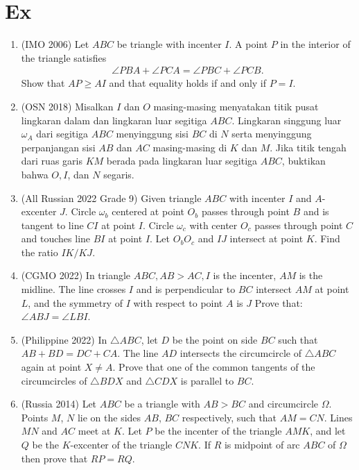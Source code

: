 \documentclass[12pt]{scrartcl}
\begin{document}
\section{Ex}
\begin{enumerate}[resume]
\item (IMO 2006) Let $ABC$ be triangle with incenter $I$. A point $P$ in the interior of the triangle satisfies
\begin{align*}
    \angle PBA + \angle PCA = \angle PBC + \angle PCB.
\end{align*}
Show that $AP \ge AI$ and that equality holds if and only if $P=I$.

\item (OSN 2018) Misalkan $I$ dan $O$ masing-masing menyatakan titik pusat lingkaran dalam dan lingkaran luar segitiga $ABC$. Lingkaran singgung luar $\omega_A$ dari segitiga $ABC$ menyinggung sisi $BC$ di $N$ serta menyinggung perpanjangan sisi $AB$ dan $AC$ masing-masing di $K$ dan $M$. Jika titik tengah dari ruas garis $KM$ berada pada lingkaran luar segitiga $ABC$, buktikan bahwa $O,I$, dan $N$ segaris.

\item (All Russian 2022 Grade 9) Given triangle $ABC$ with incenter $I$ and $A$-excenter $J$. Circle $\omega_b$ centered at point $O_b$ passes through point $B$ and is tangent to line $CI$ at point $I$. Circle $\omega_c$ with center $O_c$ passes through point $C$ and touches line $BI$ at point $I$. Let $O_bO_c$ and $IJ$ intersect at point $K$. Find the ratio $IK/KJ$.

\item (CGMO 2022) In triangle $ABC,AB>AC,I$ is the incenter, $AM$ is the midline. The line crosses $I$ and is perpendicular to $BC $ intersect $AM$ at point $L$, and the symmetry of $I$ with respect to point $A$ is $J$
Prove that: $\angle ABJ= \angle LBI$.

\item (Philippine 2022) In $\triangle ABC$, let $D$ be the point on side $BC$ such that $AB+BD=DC+CA.$ The line $AD$ intersects the circumcircle of $\triangle ABC$ again at point $X \neq A$. Prove that one of the common tangents of the circumcircles of $\triangle BDX$ and $\triangle CDX$ is parallel to $BC$.

\item 	(Russia 2014) Let $ABC$ be a triangle with $AB>BC$ and circumcircle $\Omega$. Points $M$, $N$ lie on the sides $AB$, $BC$ respectively, such that $AM=CN$. Lines $MN$ and $AC$ meet at $K$. Let $P$ be the incenter of the triangle $AMK$, and let $Q$ be the $K$-excenter of the triangle $CNK$. If $R$ is midpoint of arc $ABC$ of $\Omega$ then prove that $RP=RQ$.


\end{enumerate}
\end{document}
